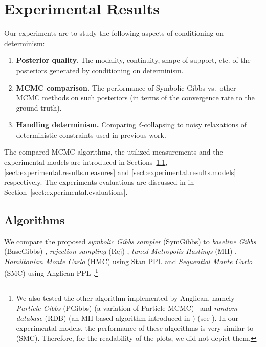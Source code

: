 \documentclass[]{article}
\begin{document}
\section{Experimental Results}
\label{sect:experimental.results}

Our experiments are to study the 
following aspects of conditioning on determinism:
\vspace{-2mm}
\begin{enumerate}[label=(\alph*)]
\item {\bf Posterior quality.} The modality, continuity, shape of support, etc. of the posteriors generated by conditioning on determinism.
\item {\bf MCMC comparison.} The performance of Symbolic Gibbs vs.\ other MCMC methods on such posteriors
(in terms of the convergence rate to the ground truth).
\item {\bf Handling determinism.} Comparing $\delta$-collapsing to noisy relaxations of deterministic constraints used in previous work. 
\end{enumerate}
\vspace{-2mm}
The compared MCMC algorithms, 
the utilized measurements
and the experimental models  
are introduced in 
Sections~\ref{sect:experimental.results.algorithms},
\ref{sect:experimental.results.measures} 
and \ref{sect:experimental.results.models}
respectively.
The experiments evaluations are discussed in in 
Section~\ref{sect:experimental.evaluations}.



\subsection{Algorithms} 
\label{sect:experimental.results.algorithms}
We compare the proposed \emph{symbolic Gibbs sampler} (SymGibbs) to
\emph{baseline Gibbs} (BaseGibbs) \citep{pearl1987evidential},
\emph{rejection sampling} (Rej) \citep{hammersley1964monte}, 
\emph{tuned Metropolis-Hastings} (MH) \citep{roberts1997weak}, 
\emph{Hamiltonian Monte Carlo} (HMC) using Stan PPL \citep{stan-manual:2014}
and \emph{Sequential Monte Carlo} (SMC) using Anglican PPL \citep{wood2014new}.\footnote{
We also tested the other algorithm implemented by Anglican, namely 
\emph{Particle-Gibbs} (PGibbs) (a variation of Particle-MCMC\citep{andrieu2010particle}) \
and \emph{random database} (RDB) (an MH-based algorithm introduced in \citep{wingate2011lightweight}) (see \cite{wood2014new}).
In our experimental models, the performance of these algorithms is very similar to (SMC).
Therefore, for the readability of the plots, we did not depict them.
}
\end{document}
